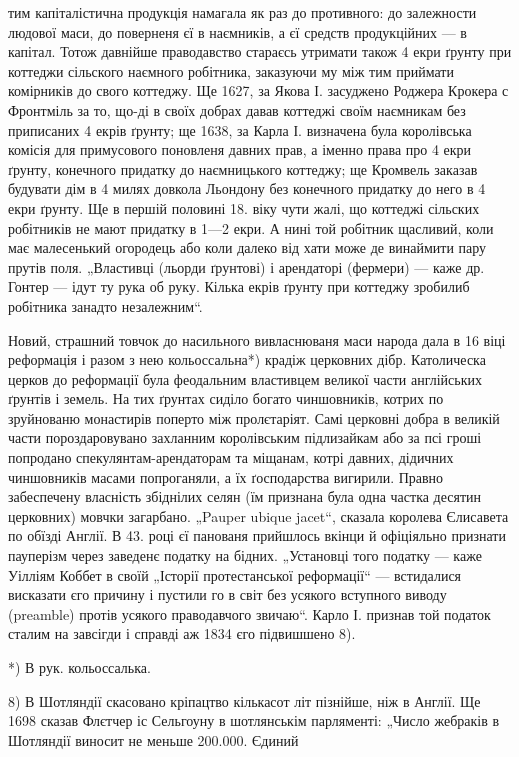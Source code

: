 тим капіталістична продукція намагала як раз до противного: до залежности людової маси, до поверненя єї в наємників, а єї средств продукційних — в капітал. Тотож давнійше праводавство стараєсь утримати також 4 екри ґрунту при коттеджи сільского наємного робітника, заказуючи му між тим приймати комірників до свого коттеджу. Ще 1627, за Якова І. засуджено Роджера Крокера с Фронтміль за то, що-ді в своїх добрах давав коттеджі своїм наємникам без приписаних 4 екрів ґрунту; ще 1638, за Карла І. визначена була королівська комісія для примусового поновленя давних прав, а іменно права про 4 екри ґрунту, конечного придатку до наємницького коттеджу; ще Кромвель заказав будувати дім в 4 милях довкола Льондону без конечного придатку до него в 4 екри ґрунту. Ще в першій половині 18. віку чути жалі, що коттеджі сільских робітників не мают придатку в 1—2 екри. А нині той робітник щасливий, коли має малесенький огородець або коли далеко від хати може де винаймити пару прутів поля. „Властивці (льорди ґрунтові) і арендаторі (фермери) — каже др. Гонтер — ідут ту рука об руку. Кілька екрів ґрунту при коттеджу зробилиб робітника занадто незалежним“.

Новий, страшний товчок до насильного вивласнюваня маси народа дала в 16 віці реформація і разом з нею кольоссальна*) крадіж церковних дібр. Католическа церков до реформації була феодальним властивцем великої части англійських ґрунтів і земель. На тих ґрунтах сиділо богато чиншовників, котрих по зруйнованю монастирів поперто між пролєтаріят. Самі церковні добра в великій части пороздаровувано захланним королівським підлизайкам або за псі гроші попродано спекулянтам-арендаторам та міщанам, котрі давних, дідичних чиншовників масами попроганяли, а їх ґосподарства вигирили. Правно забеспечену власність збіднілих селян (їм признана була одна частка десятин церковних) мовчки загарбано. „Pauper ubique jacet“, сказала королева Єлисавета по обїзді Англії. В 43. році єї панованя прийшлось вкінци й офіціяльно признати пауперізм через заведенє податку на бідних. „Установці того податку
— каже Уілліям Коббет в своїй „Історії протестанської реформації“ — встидалися висказати єго причину і пустили го в світ без усякого вступного виводу (preamble) протів усякого праводавчого звичаю“. Карло І. признав той податок сталим на завсігди і справді аж 1834 єго підвишшено 8).

*) В рук. кольоссалька.

8) В Шотляндії скасовано кріпацтво кількасот літ пізнійше, ніж в Англії. Ще 1698 сказав Флєтчер іс Сельгоуну в шотлянськім парляменті: „Число жебраків в Шотляндії виносит не меньше 200.000. Єдиний
